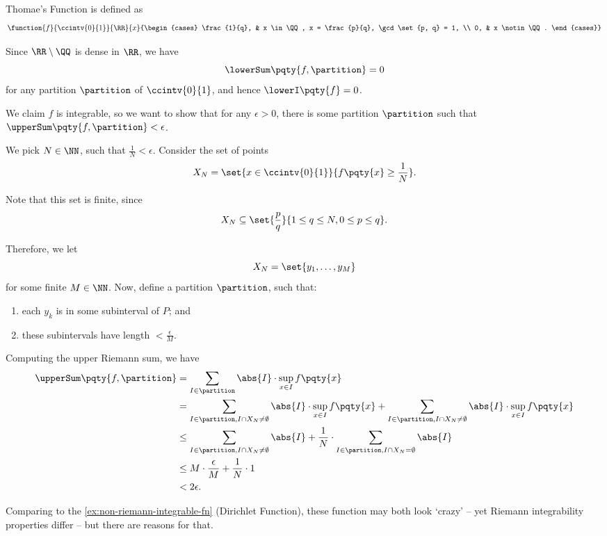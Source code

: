 \begin{example}
    \label{ex:thomae-function}%
    Thomae's Function is defined as
    \[
        \function{f}{\ccintv{0}{1}}{\RR}{x}{\begin{cases}
            \frac{1}{q}, & x \in \QQ, x = \frac{p}{q}, \gcd\set{p, q} = 1, \\
            0, & x \notin \QQ.
        \end{cases}}
    \]

    Since \(\RR \setminus \QQ\) is dense in \(\RR\), we have
    \[
        \lowerSum\pqty{f, \partition} = 0
    \]
    for any partition \(\partition\) of \(\ccintv{0}{1}\), and hence \(\lowerI\pqty{f} = 0\).

    We claim \(f\) is integrable, so we want to show that for any \(\epsilon > 0\), there is some partition \(\partition\) such that \(\upperSum\pqty{f, \partition} < \epsilon\).

    We pick \(N \in \NN\), such that \(\frac{1}{N} < \epsilon\). Consider the set of points
    \[
        X_N = \set{x \in \ccintv{0}{1}}{f\pqty{x} \geq \frac{1}{N}}.
    \]

    Note that this set is finite, since
    \[
        X_N \subseteq \set{\frac{p}{q}}{1 \leq q \leq N, 0 \leq p \leq q}.
    \]

    Therefore, we let
    \[
        X_N = \set{y_1, \ldots, y_M}
    \]
    for some finite \(M \in \NN\). Now, define a partition \(\partition\), such that:
    \begin{enumerate}
        \item each \(y_k\) is in some subinterval of \(P\); and
        \item these subintervals have length \(< \frac{\epsilon}{M}\).
    \end{enumerate}

    Computing the upper Riemann sum, we have
    \begin{align*}
        \upperSum\pqty{f, \partition} &= \sum_{I \in \partition} \abs{I} \cdot \sup_{x \in I} f\pqty{x} \\
        &= \sum_{I \in \partition, I \cap X_N \neq \emptyset} \abs{I} \cdot \sup_{x \in I} f\pqty{x} + \sum_{I \in \partition, I \cap X_N \neq \emptyset} \abs{I} \cdot \sup_{x \in I} f\pqty{x} \\
        &\leq \sum_{I \in \partition, I \cap X_N \neq \emptyset} \abs{I} + \frac{1}{N} \cdot \sum_{I \in \partition, I \cap X_N = \emptyset} \abs{I} \\
        &\leq M \cdot \frac{\epsilon}{M} + \frac{1}{N} \cdot 1 \\
        &< 2 \epsilon.
    \end{align*}

    Comparing to the \autoref{ex:non-riemann-integrable-fn} (Dirichlet Function), these function may both look `crazy' -- yet Riemann integrability properties differ -- but there are reasons for that.
\end{example}

